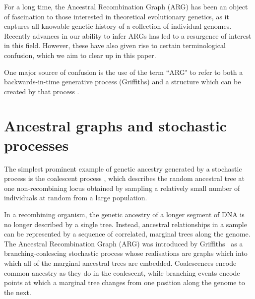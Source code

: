 \documentclass{article}
\begin{document}

For a long time, the Ancestral Recombination Graph (ARG) has been an object of
fascination to those interested in theoretical evolutionary genetics, as it
captures all knowable genetic history of a collection of individual genomes.
Recently advances in our ability to infer ARGs has led to a resurgence of
interest in this field. However, these have also given rise to certain
terminological confusion, which we aim to clear up in this paper.

One major source of confusion is the use of the term ``ARG" to refer to both a
backwards-in-time generative process (Griffiths) and a structure which can be
created by that process
\citep[e.g.][]{minichiello2006mapping,mathieson2020ancestry}.

\section*{Ancestral graphs and stochastic processes}


The simplest prominent example of genetic ancestry generated by a stochastic process
is the coalescent process \citep{kingman1982coalescent,kingman1982genealogy,
hudson1983testing, tajima1983evolutionary}, which describes the random
ancestral tree at one non-recombining locus obtained by sampling a relatively
small number of individuals at random from a large population.

In a recombining organism, the genetic ancestry of a longer segment of DNA is
no longer described by a single tree. Instead, ancestral relationships in a
sample can be represented by a sequence of correlated, marginal trees along the
genome. The Ancestral Recombination Graph (ARG) was introduced by
Griffiths~\citep{griffiths1991two,griffiths1997ancestral} as a branching-coalescing
stochastic process whose realisations are graphs which into which all of the
marginal ancestral trees are embedded. Coalescences encode common ancestry
as they do in the coalescent, while branching events encode points at which a
marginal tree changes from one position along the genome to the next.
\end{document}
